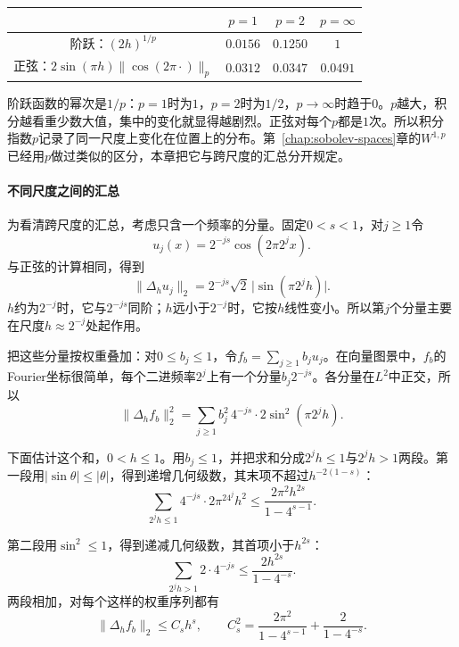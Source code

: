\begin{BookInlineTable}
  \centering
  \begin{tabular}{@{}cccc@{}}
    \toprule
    & $p=1$ & $p=2$ & $p=\infty$\\
    \midrule
    阶跃：$(2h)^{1/p}$ & $0.0156$ & $0.1250$ & $1$\\
    正弦：$2\sin(\pi h)\lVert\cos(2\pi\cdot)\rVert_p$ & $0.0312$ & $0.0347$ & $0.0491$\\
    \bottomrule
  \end{tabular}
  \caption{$h=1/128$时的$\lVert\Delta_h\cdot\rVert_p$。阶跃的变化集中，读数随$p$剧烈变化；正弦的变化分散，读数几乎不变。}
  \label{tab:besov-p-position}
\end{BookInlineTable}

阶跃函数的幂次是$1/p$：$p=1$时为$1$，$p=2$时为$1/2$，$p\to\infty$时趋于$0$。$p$越大，积分越看重少数大值，集中的变化就显得越剧烈。正弦对每个$p$都是$1$次。所以积分指数$p$记录了同一尺度上变化在位置上的分布。第~\ref{chap:sobolev-spaces}章的$W^{1,p}$已经用$p$做过类似的区分，本章把它与跨尺度的汇总分开规定。

\paragraph{不同尺度之间的汇总}
为看清跨尺度的汇总，考虑只含一个频率的分量。固定$0<s<1$，对$j\geq1$令
\[
 u_j(x)=2^{-js}\cos(2\pi2^jx).
\]
与正弦的计算相同，得到
\[
 \lVert\Delta_hu_j\rVert_2=2^{-js}\sqrt2\,\lvert\sin(\pi2^jh)\rvert .
\]
$h$约为$2^{-j}$时，它与$2^{-js}$同阶；$h$远小于$2^{-j}$时，它按$h$线性变小。所以第$j$个分量主要在尺度$h\approx2^{-j}$处起作用。

把这些分量按权重叠加：对$0\leq b_j\leq1$，令$f_b=\sum_{j\geq1}b_ju_j$。在向量图景中，$f_b$的Fourier坐标很简单，每个二进频率$2^j$上有一个分量$b_j2^{-js}$。各分量在$L^2$中正交，所以
\[
 \lVert\Delta_hf_b\rVert_2^2=\sum_{j\geq1}b_j^2\,4^{-js}\cdot2\sin^2(\pi2^jh).
\]

下面估计这个和，$0<h\leq1$。用$b_j\leq1$，并把求和分成$2^jh\leq1$与$2^jh>1$两段。第一段用$\lvert\sin\theta\rvert\leq\lvert\theta\rvert$，得到递增几何级数，其末项不超过$h^{-2(1-s)}$：
\[
 \sum_{2^jh\leq1}4^{-js}\cdot2\pi^24^jh^2\leq\frac{2\pi^2h^{2s}}{1-4^{s-1}} .
\]

第二段用$\sin^2\leq1$，得到递减几何级数，其首项小于$h^{2s}$：
\[
 \sum_{2^jh>1}2\cdot4^{-js}\leq\frac{2h^{2s}}{1-4^{-s}} .
\]
两段相加，对每个这样的权重序列都有
\begin{equation}
 \lVert\Delta_hf_b\rVert_2\leq C_sh^s,\qquad C_s^2=\frac{2\pi^2}{1-4^{s-1}}+\frac{2}{1-4^{-s}} .
 \label{eq:besov-fb-upper}
\end{equation}

